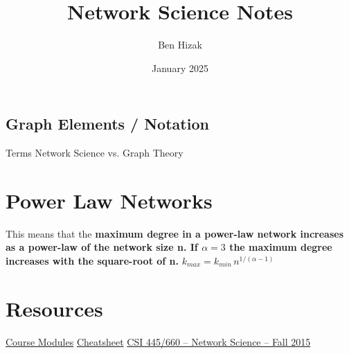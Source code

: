 \documentclass[crop=false]{standalone}
\title{Network Science Notes}
\author{Ben Hizak}
\date{January 2025}
\begin{document}
\maketitle 



\subsection{Graph Elements / Notation}

Terms Network Science vs. Graph Theory


\section{Power Law Networks}
This means that the \textbf{maximum degree in a power-law network increases as a power-law of the network size n. If $\alpha=3$ the maximum degree increases with the square-root of n.} 
$k_{max} = k_{min} \, n^{1/(\alpha-1)}$
\section{Resources}
\href{https://gatech.instructure.com/courses/433540/modules}{Course Modules}
\href{https://cazabetremy.fr/Teaching/CN2021/CheatSheet/CN_CS_introduction.pdf}{Cheatsheet}
\href{https://www.albany.edu/~ravi/pdfs/sol_hw2.pdf}{CSI 445/660 – Network Science – Fall 2015}
\end{document}
